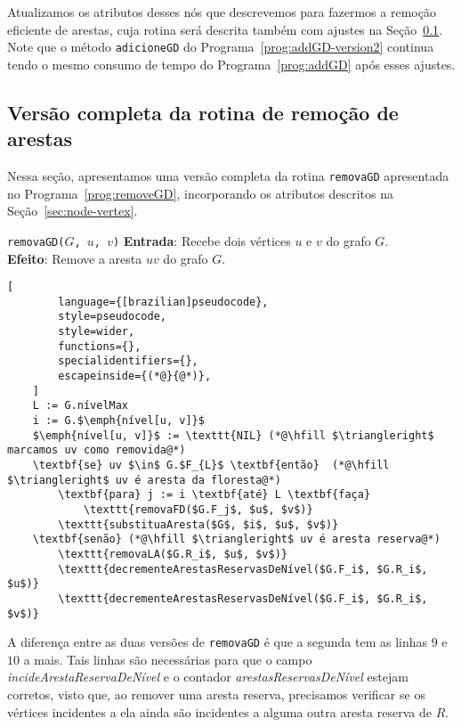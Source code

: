 Atualizamos os atributos desses nós que descrevemos para fazermos a remoção eficiente de arestas, cuja rotina será descrita também com ajustes na Seção~\ref{sec:code-edge-removal-second-version}. Note que o método \texttt{adicioneGD} do Programa~\ref{prog:addGD-version2} continua tendo o mesmo consumo de tempo do Programa~\ref{prog:addGD} após esses ajustes. 

\subsection{Versão completa da rotina de remoção de arestas}
\label{sec:code-edge-removal-second-version}

Nessa seção, apresentamos uma versão completa da rotina \texttt{removaGD} apresentada no Programa~\ref{prog:removeGD}, incorporando os atributos descritos na Seção~\ref{sec:node-vertex}. 

\begin{programruledcaption}{\texttt{removaGD($G$, $u$, $v$)} \label{prog:removeGD-version2}}
    \noindent\textbf{Entrada}: Recebe dois vértices $u$ e $v$ do grafo $G$. \\
    \noindent\textbf{Efeito}: Remove a aresta $uv$ do grafo $G$. 
    \vspace{-0.5\baselineskip}
    \begin{lstlisting}[
        language={[brazilian]pseudocode},
        style=pseudocode,
        style=wider,
        functions={},
        specialidentifiers={},
        escapeinside={(*@}{@*)},
    ]
    L := G.nívelMax
    i := G.$\emph{nível[u, v]}$
    $\emph{nível[u, v]}$ := \texttt{NIL} (*@\hfill $\triangleright$ marcamos uv como removida@*)
    \textbf{se} uv $\in$ G.$F_{L}$ \textbf{então}  (*@\hfill $\triangleright$ uv é aresta da floresta@*)
        \textbf{para} j := i \textbf{até} L \textbf{faça}
            \texttt{removaFD($G.F_j$, $u$, $v$)}
        \texttt{substituaAresta($G$, $i$, $u$, $v$)}
    \textbf{senão} (*@\hfill $\triangleright$ uv é aresta reserva@*)
        \texttt{removaLA($G.R_i$, $u$, $v$)}
        \texttt{decrementeArestasReservasDeNível($G.F_i$, $G.R_i$, $u$)}
        \texttt{decrementeArestasReservasDeNível($G.F_i$, $G.R_i$, $v$)}
    \end{lstlisting}
    \vspace{-0.5\baselineskip}
\end{programruledcaption}

A diferença entre as duas versões de \texttt{removaGD} é que a segunda tem as linhas $9$ e $10$ a mais. Tais linhas são necessárias para que o campo \textit{incideArestaReservaDeNível} e o contador \textit{arestasReservasDeNível} estejam corretos, visto que, ao remover uma aresta reserva, precisamos verificar se os vértices incidentes a ela ainda são incidentes a alguma outra aresta reserva de $R$.  


